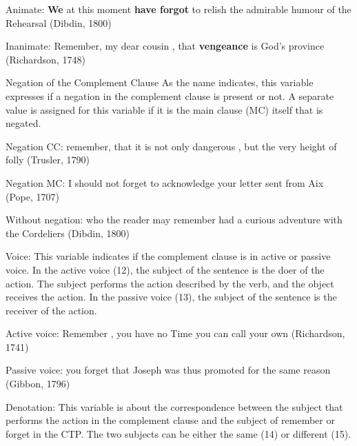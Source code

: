 \documentclass[final]{clv3} %
\begin{document}
\begin{example}
Animate: \textbf{We} at this moment \textbf{have forgot} to relish the admirable humour of the Rehearsal  (Dibdin, 1800)
\end{example}

\begin{example}
Inanimate: Remember, my dear cousin , that \textbf{vengeance} is God's province  (Richardson, 1748)
\end{example}

\item {Negation of the Complement Clause}  As the name indicates, this variable expresses if a negation in the complement clause is present or not. A separate value is assigned for this variable if it is the main clause (MC) itself that is negated.

\begin{example}
Negation CC:  remember, that it is not only dangerous , but the very height of folly   (Trusler, 1790)
\end{example}

\begin{example}
Negation MC:   I should not forget to acknowledge your letter sent from Aix (Pope, 1707)
\end{example}

\begin{example}
Without negation: who the reader may remember had a curious adventure with the Cordeliers   (Dibdin, 1800)
\end{example}

\item {Voice:} This variable indicates if the complement clause is in active or passive voice. In the active voice (12), the subject of the sentence is the doer of the action. The subject performs the action described by the verb, and the object receives the action. In the passive voice (13), the subject of the sentence is the receiver of the action.

\begin{example}
Active voice:  Remember , you have no Time you can call your own   (Richardson, 1741)
\end{example}

\begin{example}
Passive voice:  you forget that Joseph was thus promoted for the same reason  (Gibbon, 1796)
\end{example}

\item{Denotation:} This variable is about the correspondence between the subject that performs the action in the complement clause and the subject of remember or forget in the CTP. The two subjects can be either the same (14) or different (15).
\end{document}
